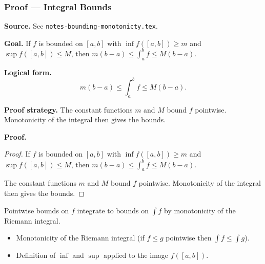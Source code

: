 
\clearpage
{}
\hypertarget{proof-RA-ABB-C-integral-bounds}{}

\subsubsection[Integral Bounds]{Proof --- Integral Bounds}

\bigskip

\noindent
\textbf{Source.}
See \texttt{notes-bounding-monotonicty.tex}.

\vspace{0.75em}

\noindent
\textbf{Goal.}
If $f$ is bounded on $[a,b]$ with $\inf f([a,b]) \ge m$ and $\sup f([a,b]) \le M$, then $m(b-a) \le \int_a^b f \le M(b-a)$.

\vspace{0.75em}

\noindent
\textbf{Logical form.}
\[
  m(b-a) \le \int_a^b f \le M(b-a).
\]

\vspace{0.75em}

\noindent
\textbf{Proof strategy.}
The constant functions $m$ and $M$ bound $f$ pointwise. Monotonicity of the integral then gives the bounds.

\vspace{0.75em}

\noindent
\textbf{Proof.}
\begin{proof}
\Claim If $f$ is bounded on $[a,b]$ with $\inf f([a,b]) \ge m$ and $\sup f([a,b]) \le M$, then $m(b-a) \le \int_a^b f \le M(b-a)$.

\Given 

\Goal 

\Strategy The constant functions $m$ and $M$ bound $f$ pointwise. Monotonicity of the integral then gives the bounds.

\medskip


\end{proof}

\begin{remark*}
Pointwise bounds on $f$ integrate to bounds on $\int f$ by monotonicity of the Riemann integral.
\end{remark*}

\begin{remark*}[Dependencies]
\begin{itemize}
  \item Monotonicity of the Riemann integral (if $f \le g$ pointwise then $\int f \le \int g$).
  \item Definition of $\inf$ and $\sup$ applied to the image $f([a,b])$.
\end{itemize}
\end{remark*}
